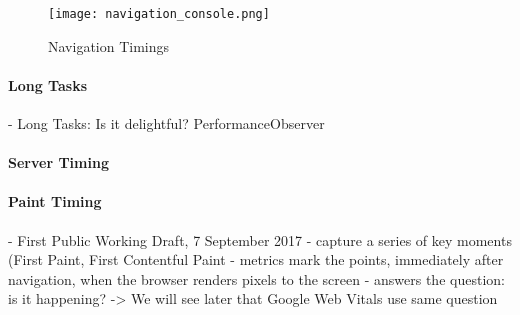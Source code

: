\begin{figure}[h!]
\begin{center}
\texttt{[image: navigation\_console.png]}
\caption{Navigation Timings}
\label{img:navigation_console}
\end{center}
\end{figure}











\paragraph{Long Tasks}



- Long Tasks: Is it delightful? PerformanceObserver




\paragraph{Server Timing}








\paragraph{Paint Timing}



-  First Public Working Draft, 7 September 2017
-  capture a series of key moments (First Paint, First Contentful Paint
- metrics mark the points, immediately after navigation, when the browser renders pixels to the screen
- answers the question: is it happening? -> We will see later that Google Web Vitals use same question

